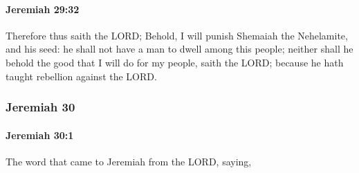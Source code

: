 		\paragraph{Jeremiah 29:32} %
			\label{JEREMIAH-29-32}

			Therefore thus saith the LORD; Behold, I will punish Shemaiah the Nehelamite, and his seed: he shall not have a man to dwell among this people; neither shall he behold the good that I will do for my people, saith the LORD; because he hath taught rebellion against the LORD.

	\subsubsection{Jeremiah 30} %
		\label{JEREMIAH-30}

		\paragraph{Jeremiah 30:1} %
			\label{JEREMIAH-30-1}

			The word that came to Jeremiah from the LORD, saying,


